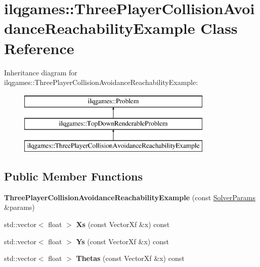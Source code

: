 \hypertarget{classilqgames_1_1_three_player_collision_avoidance_reachability_example}{}\section{ilqgames\+:\+:Three\+Player\+Collision\+Avoidance\+Reachability\+Example Class Reference}
\label{classilqgames_1_1_three_player_collision_avoidance_reachability_example}
Inheritance diagram for ilqgames\+:\+:Three\+Player\+Collision\+Avoidance\+Reachability\+Example\+:\begin{figure}[H]
\begin{center}
\leavevmode
\includegraphics[height=3.000000cm]{classilqgames_1_1_three_player_collision_avoidance_reachability_example}
\end{center}
\end{figure}
\subsection*{Public Member Functions}
\begin{DoxyCompactItemize}
\item 
{\bfseries Three\+Player\+Collision\+Avoidance\+Reachability\+Example} (const \hyperlink{structilqgames_1_1_solver_params}{Solver\+Params} \&params)\hypertarget{classilqgames_1_1_three_player_collision_avoidance_reachability_example_a02ba0e88f32c81504311c8ef887b6d6b}{}\label{classilqgames_1_1_three_player_collision_avoidance_reachability_example_a02ba0e88f32c81504311c8ef887b6d6b}

\item 
std\+::vector$<$ float $>$ {\bfseries Xs} (const Vector\+Xf \&x) const \hypertarget{classilqgames_1_1_three_player_collision_avoidance_reachability_example_a2a84d8d679c389a2518e8a5831c77efe}{}\label{classilqgames_1_1_three_player_collision_avoidance_reachability_example_a2a84d8d679c389a2518e8a5831c77efe}

\item 
std\+::vector$<$ float $>$ {\bfseries Ys} (const Vector\+Xf \&x) const \hypertarget{classilqgames_1_1_three_player_collision_avoidance_reachability_example_af7e78eadcbfd56ae24a9ee7e89081f8c}{}\label{classilqgames_1_1_three_player_collision_avoidance_reachability_example_af7e78eadcbfd56ae24a9ee7e89081f8c}

\item 
std\+::vector$<$ float $>$ {\bfseries Thetas} (const Vector\+Xf \&x) const \hypertarget{classilqgames_1_1_three_player_collision_avoidance_reachability_example_a1563fa42643df8d229827c2055255070}{}\label{classilqgames_1_1_three_player_collision_avoidance_reachability_example_a1563fa42643df8d229827c2055255070}

\end{DoxyCompactItemize}
